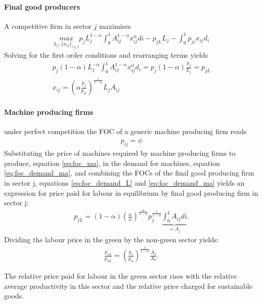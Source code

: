 \paragraph{Final good producers}
A competitive firm in sector $j$ maximises
\begin{align*}
\underset{L_j, \{x_{ij}\}_{i \in I}}{max} p_{j} L_j^{1-\alpha} \int_{0}^{1}A_{ij}^{1-\alpha}x_{ij}^\alpha di - p_{jL} L_j - \int_{0}^{1} p_{ji}x_{ij} d_i
\end{align*}
Solving for the first order conditions and rearranging terms yields
\begin{align}
p_j(1-\alpha) L_j^{-\alpha}\int_{0}^{1}A_{ij}^{1-\alpha}x_{ij}^\alpha d_i= p_j (1-\alpha)\frac{y_j}{L_j}=p_{jL}\label{eq:foc_demand_L}
\\
x_{ij} = \left(\alpha\frac{p_j}{p_{ji}}\right)^\frac{1}{1-\alpha}L_j A_{ij}\label{eq:foc_demand_ma}
\end{align}

\paragraph{Machine producing firms}
under perfect competition the FOC of a generic machine producing firm reads
\begin{align}\label{eq:foc_ma}
p_{ij}=\psi
\end{align}
Substituting the price of machines required by machine producing firms to produce,  equation \ref{eq:foc_ma}, in the demand for machines, equation \ref{eq:foc_demand_ma}, and combining the FOCs of the final good producing firm in sector j, equations \ref{eq:foc_demand_L} and \ref{eq:foc_demand_ma} yields an expression for price paid for labour in equilibrium by final good producing firm in sector j:
\begin{align}
p_{jL}= (1-\alpha)\left(\frac{\alpha}{\psi}\right)^\frac{\alpha}{1-\alpha}p_j^\frac{1}{1-\alpha}\underbrace{\int_{0}^{1} A_{ij} di}_{=A_j}.
\end{align}
Dividing the labour price in the green by the non-green sector yields:
\begin{align}
\frac{p_{sL}}{p_{nL}}= \left(\frac{p_s}{p_n}\right)^\frac{1}{1-\alpha} \frac{A_s}{A_n}.\label{eq:firms_labrel}
\end{align}

The relative price paid for labour in the green sector rises with the relative average productivity in this sector and the relative price charged for sustainable goods. 

